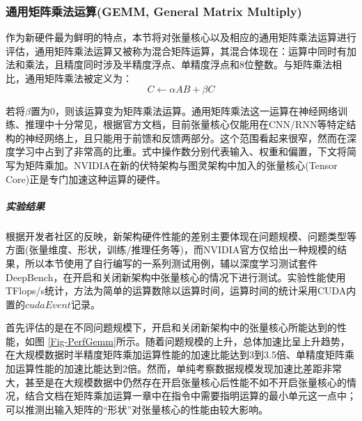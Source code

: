 \subsubsection{通用矩阵乘法运算(GEMM, General Matrix Multiply)}
\par 作为新硬件最为鲜明的特点，本节将对张量核心以及相应的通用矩阵乘法运算进行评估，通用矩阵乘法运算又被称为混合矩阵运算，其混合体现在：运算中同时有加法和乘法，且精度同时涉及半精度浮点、单精度浮点和8位整数。与矩阵乘法相比，通用矩阵乘法被定义为：
$$ C \leftarrow \alpha AB + \beta C $$
\par 若将$ \beta $置为0，则该运算变为矩阵乘法运算。通用矩阵乘法这一运算在神经网络训练、推理中十分常见，根据官方文档，目前张量核心仅能用在CNN/RNN等特定结构的神经网络上，且只能用于前馈和反馈两部分。这个范围看起来很窄，然而在深度学习中占到了非常高的比重。式中操作数分别代表输入、权重和偏置，下文将简写为矩阵乘加。NVIDIA在新的伏特架构与图灵架构中加入的张量核心(Tensor Core)正是专门加速这种运算的硬件。
\subparagraph{实验结果}
\par 根据开发者社区的反映，新架构硬件性能的差别主要体现在问题规模、问题类型等方面(张量维度、形状，训练/推理任务等)，而NVIDIA官方仅给出一种规模的结果，所以本节使用了自行编写的一系列测试用例，辅以深度学习测试套件DeepBench\cite{DEEPBENCH}，在开启和关闭新架构中张量核心的情况下进行测试。实验性能使用TFlops/s统计，方法为简单的运算数除以运算时间，运算时间的统计采用CUDA内置的$ cudaEvent $记录。
\par 首先评估的是在不同问题规模下，开启和关闭新架构中的张量核心所能达到的性能，如图 \ref{Fig-PerfGemm}所示。随着问题规模的上升，总体加速比呈上升趋势，在大规模数据时半精度矩阵乘加运算性能的加速比能达到3到3.5倍、单精度矩阵乘加运算性能的加速比能达到2倍。然而，单纯考察数据规模发现加速比差距非常大，甚至是在大规模数据中仍然存在开启张量核心后性能不如不开启张量核心的情况，结合文档在矩阵乘加运算一章中在指令中需要指明运算的最小单元这一点中\cite{PTX}；可以推测出输入矩阵的“形状”对张量核心的性能由较大影响。
